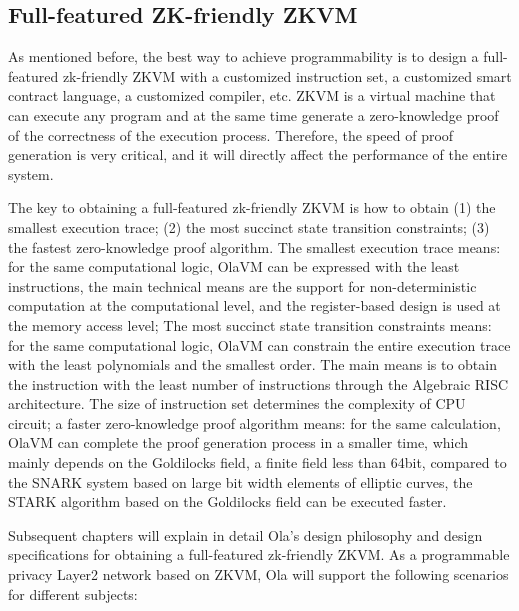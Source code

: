 \subsection{Full-featured ZK-friendly ZKVM}

As mentioned before, the best way to achieve programmability is to design a full-featured zk-friendly ZKVM with a customized instruction set, a customized smart contract language, a customized compiler, etc. 
ZKVM is a virtual machine that can execute any program and at the same time generate a zero-knowledge proof of the correctness of the execution process. Therefore, the speed of proof generation 
is very critical, and it will directly affect the performance of the entire system.

The key to obtaining a full-featured zk-friendly ZKVM is how to obtain (1) the smallest execution trace; (2) the most succinct state transition constraints; (3) the fastest 
zero-knowledge proof algorithm. The smallest execution trace means: for the same computational logic, OlaVM \cite{website:OlaVM} can be expressed with the least instructions, the main technical means are the 
support for non-deterministic computation at the computational level, and the register-based design is used at the memory access level; The most succinct state transition constraints means: 
for the same computational logic, OlaVM \cite{website:OlaVM} can constrain the entire execution trace with the least polynomials and the smallest order. The main means is to obtain the instruction with the least 
number of instructions through the Algebraic RISC architecture. The size of instruction set determines the complexity of CPU circuit; a faster zero-knowledge proof algorithm 
means: for the same calculation, OlaVM \cite{website:OlaVM} can complete the proof generation process in a smaller time, which mainly depends on the Goldilocks \cite{website:Goldilocks} field, a finite field less than 64bit, compared to the 
SNARK system based on large bit width elements of elliptic curves, the STARK algorithm based on the Goldilocks \cite{website:Goldilocks} field can be executed faster.

Subsequent chapters will explain in detail Ola's design philosophy and design specifications for obtaining a full-featured zk-friendly ZKVM. As a programmable privacy Layer2 network 
based on ZKVM, Ola will support the following scenarios for different subjects:


